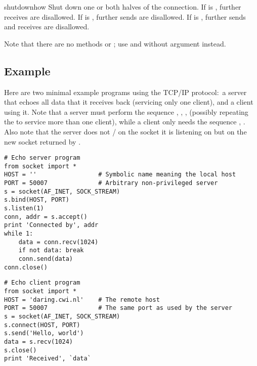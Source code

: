 \begin{funcdesc}{shutdown}{how}
Shut down one or both halves of the connection.  If  is ,
further receives are disallowed.  If  is , further sends are
disallowed.  If  is , further sends and receives are
disallowed.
\end{funcdesc}

Note that there are no methods  or ; use
 and  without  argument instead.

\subsection{Example}

Here are two minimal example programs using the TCP/IP protocol:\ a
server that echoes all data that it receives back (servicing only one
client), and a client using it.  Note that a server must perform the
sequence , , , 
(possibly repeating the  to service more than one client),
while a client only needs the sequence , .
Also note that the server does not / on the
socket it is listening on but on the new socket returned by
.

\bcode\begin{verbatim}
# Echo server program
from socket import *
HOST = ''                 # Symbolic name meaning the local host
PORT = 50007              # Arbitrary non-privileged server
s = socket(AF_INET, SOCK_STREAM)
s.bind(HOST, PORT)
s.listen(1)
conn, addr = s.accept()
print 'Connected by', addr
while 1:
    data = conn.recv(1024)
    if not data: break
    conn.send(data)
conn.close()
\end{verbatim}\ecode
%
\bcode\begin{verbatim}
# Echo client program
from socket import *
HOST = 'daring.cwi.nl'    # The remote host
PORT = 50007              # The same port as used by the server
s = socket(AF_INET, SOCK_STREAM)
s.connect(HOST, PORT)
s.send('Hello, world')
data = s.recv(1024)
s.close()
print 'Received', `data`
\end{verbatim}\ecode
%
\begin{seealso}
\end{seealso}
